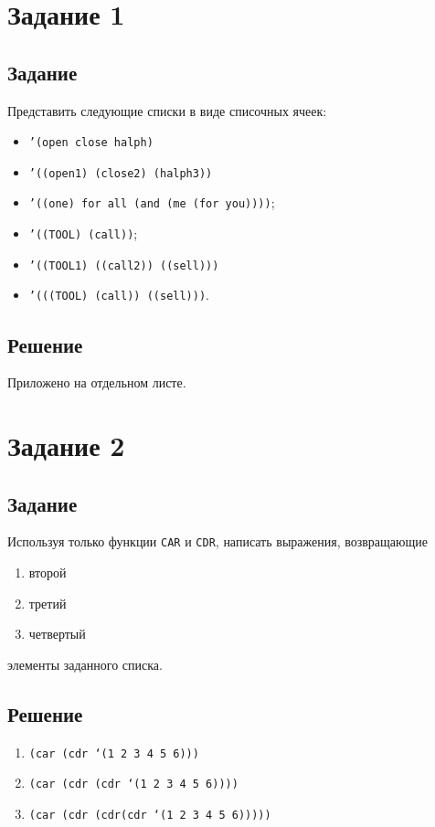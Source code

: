 \section{Задание 1}
\subsection{Задание}
Представить следующие списки в виде списочных ячеек:

\begin{itemize}
	\item \texttt{'(open close halph)}
	\item \texttt{'((open1) (close2) (halph3))} 
	\item \texttt{'((one) for all (and (me (for you))))};
	\item \texttt{'((TOOL) (call))};
	\item \texttt{'((TOOL1) ((call2)) ((sell)))}
	\item \texttt{'(((TOOL) (call)) ((sell)))}.
\end{itemize}


\subsection{Решение}
Приложено на отдельном листе.

\section{Задание 2}
\subsection{Задание}
Используя только функции \texttt{CAR} и \texttt{CDR}, написать выражения, возвращающие

\begin{enumerate}
	\item второй
	\item третий
	\item четвертый
\end{enumerate}

элементы заданного списка.

\subsection{Решение}
\begin{enumerate}
	\item \texttt{(car (cdr `(1 2 3 4 5 6)))}
	\item \texttt{(car (cdr (cdr `(1 2 3 4 5 6))))}
	\item \texttt{(car (cdr (cdr(cdr `(1 2 3 4 5 6)))))}
\end{enumerate}

